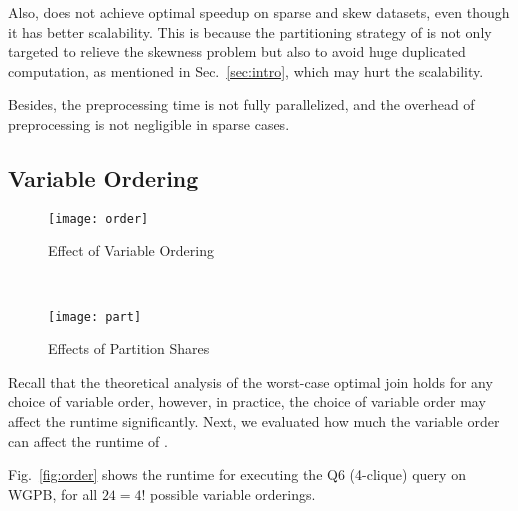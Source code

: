 Also, \name does not achieve optimal speedup on sparse and skew datasets, even though it has better scalability. This is because the partitioning strategy of \name is not only targeted to relieve the skewness problem but also to avoid huge duplicated computation, as mentioned in Sec.~\ref{sec:intro}, which may hurt the scalability. 

Besides, the preprocessing time is not fully parallelized, and the overhead of preprocessing is not negligible in sparse cases.

			

		


\subsection{Variable Ordering}

\begin{figure}[t]
	\centering
	\begin{minipage}[b]{0.49\textwidth}
		\centering
			  \texttt{[image: order]}
			  \caption{Effect of Variable Ordering}
			  \label{fig:order}
	\end{minipage}
	~
	\begin{minipage}[b]{0.49\textwidth}
		  \texttt{[image: part]}
		  \caption{Effects of Partition Shares}
		  \label{fig:partition}
	\end{minipage}
\end{figure}

Recall that the theoretical analysis of the worst-case optimal join holds for any choice of variable order, however, in practice, the choice of variable order may affect the runtime significantly.  Next, we evaluated how much the variable order can affect the runtime of \name.  

Fig.~\ref{fig:order} shows the runtime for executing the Q6 (4-clique) query on WGPB, for all $24 = 4!$ possible variable orderings.  

